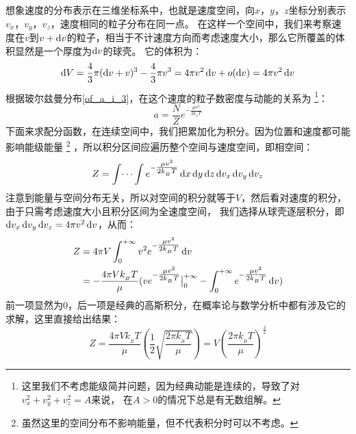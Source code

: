 \begin{prove}
    想象速度的分布表示在三维坐标系中，也就是速度空间，向$x$，$y$，$z$坐标分别表示$v_x$，$v_y$，$v_z$，速度相同的粒子分布在同一点。
    在这样一个空间中，我们来考察速度在$v$到$v+\dif{v}$的粒子，相当于不计速度方向而考虑速度大小，那么它所覆盖的体积显然是一个厚度为$\dif{v}$的球壳。
    它的体积为：
    \begin{equation}
        \dif{V} = \frac{4}{3}\pi (\dif{v}+v)^{3} - \frac{4}{3}\pi v^{3} = 4\pi v^{2}\dif{v} + o(\dif{v}) = 4\pi v^{2}\dif{v}
    \end{equation}
    根据玻尔兹曼分布\ref{of_a_i_3}，在这个速度的粒子数密度与动能的关系为
    \footnote{这里我们不考虑能级简并问题，因为经典动能是连续的，导致了对$v_{x}^{2}+v_{y}^{2}+v_{z}^{2}=A$来说，
    在$A>0$的情况下总是有无数组解。}：
    \begin{equation}
        a= \frac{N}{Z} e^{-\tfrac{\mu v^{2}}{2k_{_B}T}}
    \end{equation}
    下面来求配分函数，在连续空间中，我们把累加化为积分。因为位置和速度都可能影响能级能量
    \footnote{虽然这里的空间分布不影响能量，但不代表积分时可以不考虑。}
    ，所以积分区间应遍历整个空间与速度空间，即相空间：
    \begin{equation}
        Z =\int \dots \int e^{-\tfrac{\mu v^{2}}{2k_{_B}T}} \dif{x}\dif{y}\dif{z}\dif{v_x}\dif{v_y}\dif{v_z}
    \end{equation}
    注意到能量与空间分布无关，所以对空间的积分就等于$V$，然后看对速度的积分，由于只需考虑速度大小且积分区间为全速度空间，
    我们选择从球壳逐层积分，即$\dif{v_x}\dif{v_y}\dif{v_z} = 4\pi v^{2}\dif{v}$，从而：
    \begin{equation}
        \begin{aligned}
            Z & = 4\pi V\int_{0}^{+\infty} v^{2} e^{-\tfrac{\mu v^{2}}{2k_{_B}T}} \dif{v}                                                                           \\
              & = -\frac{4 \pi V k_{_B}T}{\mu} (ve^{-\tfrac{\mu v^{2}}{2k_{_B}T}}\big|_{0}^{+\infty} - \int_{0}^{+\infty} e^{-\tfrac{\mu v^{2}}{2k_{_B}T}} \dif{v})
        \end{aligned}
    \end{equation}
    前一项显然为0，后一项是经典的高斯积分，在概率论与数学分析中都有涉及它的求解，这里直接给出结果：
    \begin{equation}
        Z = \frac{4 \pi V k_{_B}T}{\mu} (\frac{1}{2}\sqrt{\frac{2\pi k_{_B}T}{\mu}}) = V\left(\frac{2\pi k_{_B}T}{\mu}\right)^{\frac{3}{2}}
        \label{of_Z}

\end{equation}
\end{prove}
